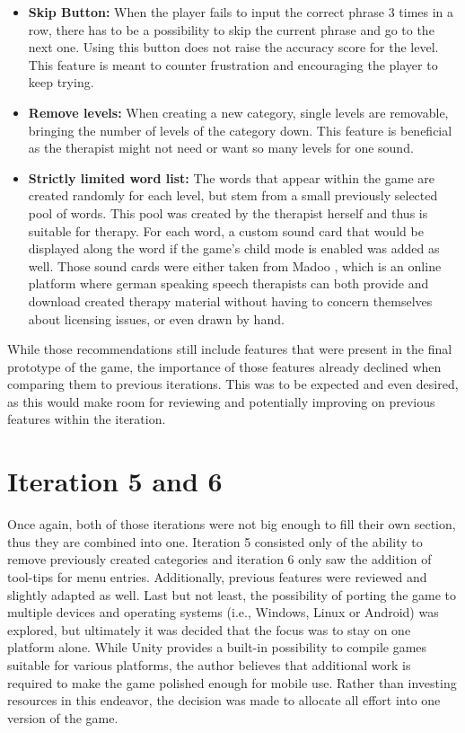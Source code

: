 \documentclass[draft,final]{vutinfth} %
\begin{document}
\begin{itemize}
\item \textbf{Skip Button:} When the player fails to input the correct phrase 3 times in a row, there has to be a possibility to skip the current phrase and go to the next one. Using this button does not raise the accuracy score for the level. This feature is meant to counter frustration and encouraging the player to keep trying.
\item \textbf{Remove levels:} When creating a new category, single levels are removable, bringing the number of levels of the category down. This feature is beneficial as the therapist might not need or want so many levels for one sound.
\item \textbf{Strictly limited word list:} The words that appear within the game are created randomly for each level, but stem from a small previously selected pool of words. This pool was created by the therapist herself and thus is suitable for therapy. For each word, a custom sound card that would be displayed along the word  if the game's child mode is enabled was added as well. Those sound cards were either taken from Madoo \cite{Madoo}, which is an online platform where german speaking speech therapists can both provide and download created therapy material without having to concern themselves about licensing issues, or even drawn by hand.
\end{itemize}
While those recommendations still include features that were present in the final prototype of the game, the importance of those features already declined when comparing them to previous iterations. This was to be expected and even desired, as this would make room for reviewing and potentially improving on previous features within the iteration.
\section{Iteration 5 and 6}
Once again, both of those iterations were not big enough to fill their own section, thus they are combined into one. Iteration 5 consisted only of the ability to remove previously created categories and iteration 6 only saw the addition of tool-tips for menu entries. Additionally, previous features were reviewed and slightly adapted as well. Last but not least, the possibility of porting the game to multiple devices and operating systems (i.e., Windows, Linux or Android) was explored, but ultimately it was decided that the focus was to stay on one platform alone. While Unity provides a built-in possibility to compile games suitable for various platforms, the author believes that additional work is required to make the game polished enough for mobile use. Rather than investing resources in this endeavor, the decision was made to allocate all effort into one version of the game.
\end{document}
